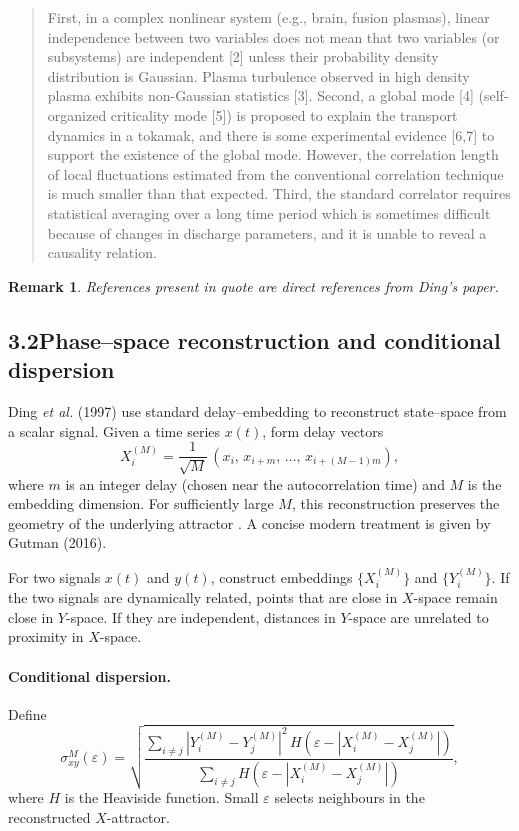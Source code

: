\documentclass[11pt]{article}
\newtheorem*{remark}{Remark}
\begin{document}
\begin{quotation}
	First, in a complex nonlinear system (e.g., brain, fusion plasmas), linear independence between two variables does not mean that two variables (or subsystems) are independent [2] unless their probability density distribution is Gaussian. Plasma turbulence observed in high density plasma exhibits non-Gaussian statistics [3]. Second, a global mode [4] (self-organized criticality mode [5]) is proposed to explain the transport dynamics in a tokamak, and there is some experimental evidence [6,7] to support the existence of the global mode. However, the correlation length of local fluctuations estimated from the conventional correlation technique is much smaller than that expected. Third, the standard correlator requires statistical averaging over a long time period which is sometimes difficult because of changes in discharge parameters, and it is unable to reveal a causality relation.
\end{quotation}
 
 \begin{remark}
 	References present in quote are direct references from Ding's paper.  \cite{dingNonlinearRadialCorrelation1997}
 \end{remark}
 
\subsection*{3.2\;Phase–space reconstruction and conditional dispersion}

Ding \textit{et al.} (1997) use standard delay–embedding to reconstruct state–space from a scalar signal. Given a time series \(x(t)\), form delay vectors
\[
X_i^{(M)}=\frac{1}{\sqrt{M}}\,(x_i,\,x_{i+m},\,\dots,\,x_{i+(M-1)m}),
\]
where \(m\) is an integer delay (chosen near the autocorrelation time) and \(M\) is the embedding dimension. For sufficiently large \(M\), this reconstruction preserves the geometry of the underlying attractor \cite{takensDetectingStrangeAttractors1981}. A concise modern treatment is given by Gutman (2016).

For two signals \(x(t)\) and \(y(t)\), construct embeddings \(\{X_i^{(M)}\}\) and \(\{Y_i^{(M)}\}\). If the two signals are dynamically related, points that are close in \(X\)-space remain close in \(Y\)-space. If they are independent, distances in \(Y\)-space are unrelated to proximity in \(X\)-space.

\paragraph{Conditional dispersion.}
Define
\[
\sigma^{M}_{xy}(\varepsilon)=
\sqrt{
\frac{\sum_{i\neq j} |Y_i^{(M)}-Y_j^{(M)}|^{2}\,
H(\varepsilon-|X_i^{(M)}-X_j^{(M)}|)}
{\sum_{i\neq j} H(\varepsilon-|X_i^{(M)}-X_j^{(M)}|)}
},
\]
where \(H\) is the Heaviside function. Small \(\varepsilon\) selects neighbours in the reconstructed \(X\)-attractor.
\end{document}
